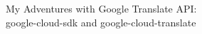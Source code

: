 \documentclass{beamer}
\begin{document}
\begin{frame}{My Adventures with Google Translate API:\\
google-cloud-sdk and google-cloud-translate}


\end{frame}
\end{document}
